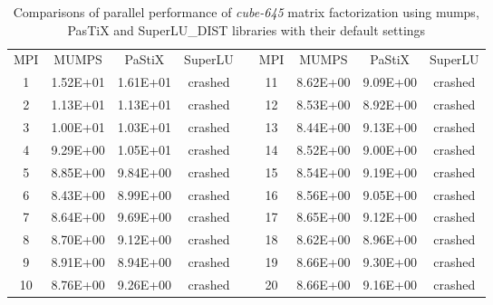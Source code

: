 \begin{table}[ht]
\centering
\begin{tabular}{|c|c|c|c|l|c|c|c|c|}
\cline{1-4} \cline{6-9}
MPI & MUMPS    & PaStiX   & SuperLU &  & MPI & MUMPS    & PaStiX   & SuperLU \\ \cline{1-4} \cline{6-9} 
1   & 1.52E+01 & 1.61E+01 & crashed &  & 11  & 8.62E+00 & 9.09E+00 & crashed \\ \cline{1-4} \cline{6-9} 
2   & 1.13E+01 & 1.13E+01 & crashed &  & 12  & 8.53E+00 & 8.92E+00 & crashed \\ \cline{1-4} \cline{6-9} 
3   & 1.00E+01 & 1.03E+01 & crashed &  & 13  & 8.44E+00 & 9.13E+00 & crashed \\ \cline{1-4} \cline{6-9} 
4   & 9.29E+00 & 1.05E+01 & crashed &  & 14  & 8.52E+00 & 9.00E+00 & crashed \\ \cline{1-4} \cline{6-9} 
5   & 8.85E+00 & 9.84E+00 & crashed &  & 15  & 8.54E+00 & 9.19E+00 & crashed \\ \cline{1-4} \cline{6-9} 
6   & 8.43E+00 & 8.99E+00 & crashed &  & 16  & 8.56E+00 & 9.05E+00 & crashed \\ \cline{1-4} \cline{6-9} 
7   & 8.64E+00 & 9.69E+00 & crashed &  & 17  & 8.65E+00 & 9.12E+00 & crashed \\ \cline{1-4} \cline{6-9} 
8   & 8.70E+00 & 9.12E+00 & crashed &  & 18  & 8.62E+00 & 8.96E+00 & crashed \\ \cline{1-4} \cline{6-9} 
9   & 8.91E+00 & 8.94E+00 & crashed &  & 19  & 8.66E+00 & 9.30E+00 & crashed \\ \cline{1-4} \cline{6-9} 
10  & 8.76E+00 & 9.26E+00 & crashed &  & 20  & 8.66E+00 & 9.16E+00 & crashed \\ \cline{1-4} \cline{6-9} 
\end{tabular}
\caption{Comparisons of parallel performance of  \textit{cube-645} matrix factorization using \gls{mumps}, PasTiX and SuperLU\_DIST libraries with their default settings}
\label{table:app-lc-cube-645-result}
\end{table}

\newpage